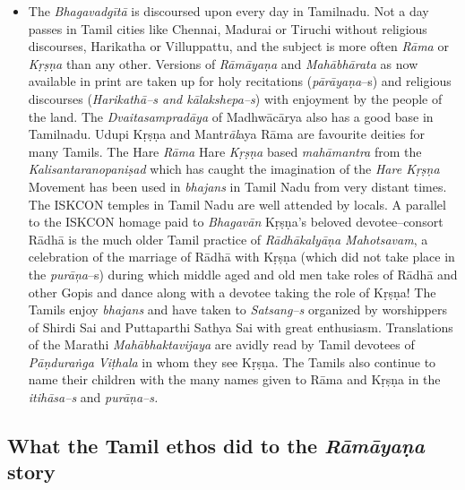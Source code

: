 \begin{itemize}
\item The \textit{Bhagavadgītā} is discoursed upon every day in Tamilnadu. Not a day passes in Tamil cities like Chennai, Madurai or Tiruchi without religious discourses, Harikatha or Villuppattu, and the subject is more often \textit{Rāma} or \textit{Kṛṣṇa} than any other. Versions of \textit{Rāmāyaṇa} and \textit{Mahābhārata} as now available in print are taken up for holy recitations (\textit{pārāyaṇa}–s) and religious discourses (\textit{Harikathā–s and kālakshepa–s}) with enjoyment by the people of the land. The \textit{Dvaitasampradāya} of Madhwācārya also has a good base in Tamilnadu. Udupi Kṛṣṇa and Mantr\textit{āl}aya Rāma are favourite deities for many Tamils. The Hare \textit{Rāma} Hare \textit{Kṛṣṇa} based \textit{mahāmantra} from the \textit{Kalisantaranopaniṣad} which has caught the imagination of the \textit{Hare Kṛṣṇa} Movement has been used in \textit{bhajans} in Tamil Nadu from very distant times. The ISKCON temples in Tamil Nadu are well attended by locals. A parallel to the ISKCON homage paid to \textit{Bhagavān} Kṛṣṇa’s beloved devotee–consort Rādhā is the much older Tamil practice of \textit{Rādhākalyāṇa Mahotsavam}, a celebration of the marriage of Rādhā with Kṛṣṇa (which did not take place in the \textit{purāņa}–s) during which middle aged and old men take roles of Rādhā and other Gopis and dance along with a devotee taking the role of Kṛṣṇa! The Tamils enjoy \textit{bhajans} and have taken to \textit{Satsang–s} organized by worshippers of Shirdi Sai and Puttaparthi Sathya Sai with great enthusiasm. Translations of the Marathi \textit{Mahābhaktavijaya} are avidly read by Tamil devotees of \textit{Pāṇduraṅga Viṭhala} in whom they see Kṛṣṇa. The Tamils also continue to name their children with the many names given to Rāma and Kṛṣṇa in the \textit{itihāsa–s} and \textit{purāṇa–s.}

\end{itemize}


\subsection*{What the Tamil ethos did to the \textit{Rāmāyaṇa} story}

